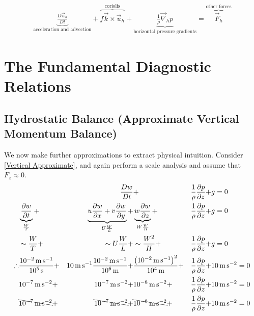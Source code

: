\begin{align*}
    \underbrace{\frac{D\vec{u}_h}{Dt}}_\text{acceleration and advection}+
    \overbrace{f\vec{k}\times\vec{u}_h}^\text{coriolis}+
    \underbrace{\frac{1}{\rho}\vec{\nabla}_hp}_\text{horizontal pressure gradients}=\overbrace{\vec{F}_h}^\text{other forces}
\end{align*}

\chapter{The Fundamental Diagnostic Relations}\label{Dia Relations}

\section{Hydrostatic Balance (Approximate Vertical Momentum Balance)}\label{App Vert Bal}

We now make further approximations to extract physical intuition. Consider \ref{Vertical Approximate}, and again perform a scale analysis and assume that $F_z\approx 0$.
\begin{align*}
    &&\frac{Dw}{Dt} &+
    & \frac{1}{\rho}\frac{\partial p}{\partial z}+
    &g=0
    \\
    &\underbrace{\frac{\partial w}{\partial t}}_{\frac{W}{T}}+ 
    &\underbrace{u\frac{\partial w}{\partial x} 
    + v\frac{\partial w}{\partial y}}_{U\frac{W}{L}}+ 
    &\underbrace{w\frac{\partial w}{\partial z}}_{W\frac{W}{H}}+ 
    &\frac{1}{\rho}\frac{\partial p}{\partial z}+
    &g=0
    \\
    &\sim\frac{W}{T}+
    &\sim U\frac{W}{L}+
    &\sim\frac{W^2}{H}+ 
    &\frac{1}{\rho}\frac{\partial p}{\partial z}+
    &g=0
    \\
    \therefore
    &\frac{\text{\qty{e-2}{\metre\per\second}}}{\text{\qty{e5}{\second}}}+ 
    &\text{\qty{10}{\metre\per\second}}\frac{\text{\qty{e-2}{\metre\per\second}}}{\text{\qty{e6}{\metre}}}+ 
    &\frac{\left( \text{\qty{e-2}{\metre\per\second}} \right)^2}{\text{\qty{e4}{\metre}}}+ 
    &\frac{1}{\rho}\frac{\partial p}{\partial z}+
    &\text{\qty{10}{\metre\per\second\squared}}=0
    \\
    &\text{\qty{e-7}{\metre\per\second\squared}}+
    &\text{\qty{e-7}{\metre\per\second\squared}}+
    &\text{\qty{e-8}{\metre\per\second\squared}}+
    &\frac{1}{\rho}\frac{\partial p}{\partial z}+
    &\text{\qty{10}{\metre\per\second\squared}}=0
    \\
    &\bcancel{\text{\qty{e-7}{\metre\per\second\squared}}}+
    &\bcancel{\text{\qty{e-7}{\metre\per\second\squared}}}+
    &\bcancel{\text{\qty{e-8}{\metre\per\second\squared}}}+
    &\frac{1}{\rho}\frac{\partial p}{\partial z}+
    &\text{\qty{10}{\metre\per\second\squared}}=0
\end{align*}

